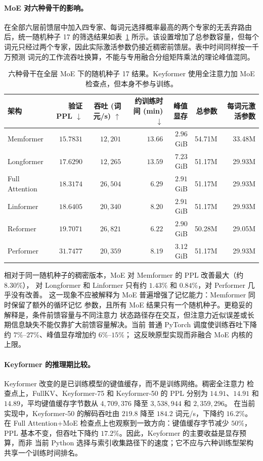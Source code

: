 \documentclass[letterpaper]{article}
\begin{document}
\paragraph{MoE 对六种骨干的影响。}
在全部六层前馈层中加入四专家、每词元选择概率最高的两个专家的无丢弃路由后，统一随机种子 17
的筛选结果如表~\ref{tab:six-moe-comparison} 所示。该设置增加了总参数容量，但每个
词元只经过两个专家，因此实际激活参数仍接近稠密前馈层。表中时间同样按一千万预测
词元的工作流吞吐换算，不能与专用融合分组矩阵乘法的理论峰值混同。

\begin{table}[t]
\centering
\scriptsize
\caption{六种骨干在全层 MoE 下的随机种子 17 结果。Keyformer 使用全注意力加 MoE 检查点，但本身不参与训练。}
\label{tab:six-moe-comparison}
\begin{tabular}{l r r r r r r}
\toprule
架构 & 验证 PPL $\downarrow$ & 吞吐 (词元/s) $\uparrow$ & 约训练时间 (min) $\downarrow$ & 峰值显存 & 总参数 & 每词元激活参数 \\
\midrule
Memformer & $15.7831$ & $12{,}201$ & $13.66$ & $2.96$ GiB & 54.71M & 33.48M \\
Longformer & $17.6290$ & $12{,}265$ & $13.59$ & $7.23$ GiB & 51.17M & 29.93M \\
Full Attention & $18.3174$ & $26{,}504$ & $6.29$ & $2.91$ GiB & 51.17M & 29.93M \\
Linformer & $18.6405$ & $20{,}340$ & $8.20$ & $2.91$ GiB & 51.17M & 29.93M \\
Reformer & $19.7071$ & $26{,}821$ & $6.22$ & $2.90$ GiB & 50.28M & 29.05M \\
Performer & $31.7477$ & $20{,}359$ & $8.19$ & $3.12$ GiB & 51.17M & 29.93M \\
\bottomrule
\end{tabular}
\end{table}

相对于同一随机种子的稠密版本，MoE 对 Memformer 的 PPL 改善最大（约 $8.30\%$），
对 Longformer 和 Linformer 只有约 $1.43\%$ 和 $0.84\%$，对 Performer 几乎没有改善。
这一现象不应被解释为 MoE 普遍增强了记忆能力：Memformer 同时保留了额外的循环记忆
参数，且所有 MoE 结果只有一个随机种子。更稳妥的解释是，条件前馈容量与不同注意力
状态路径存在交互，但注意力近似误差或长期信息缺失不能仅靠扩大前馈容量解决。当前
普通 PyTorch 调度使训练吞吐下降约 $7\%$--$27\%$、峰值显存增加约 $6\%$--$15\%$；
这反映原型实现而非融合 MoE 内核的上限。

\paragraph{Keyformer 的推理期比较。}
Keyformer 改变的是已训练模型的键值缓存，而不是训练网络。稠密全注意力
检查点上，FullKV、Keyformer-75 和 Keyformer-50 的 PPL 分别为 $14.91$、$14.91$ 和
$14.89$，平均键值缓存字节数从 $4{,}709{,}376$ 降至 $3{,}538{,}944$ 和 $2{,}359{,}296$。
在当前实现中，Keyformer-50 的解码吞吐由 $219.8$ 降至 $184.2$ 词元/s，下降约
$16.2\%$。在 Full Attention+MoE 检查点上也观察到一致方向：键值缓存字节减少 $50\%$，
PPL 基本不变，但吞吐下降约 $17.2\%$。因此，Keyformer 的主要收益是显存预算，而非
当前 Python 选择与索引收集路径下的速度；它不应与六种训练型架构共享一个训练时间排名。
\end{document}
